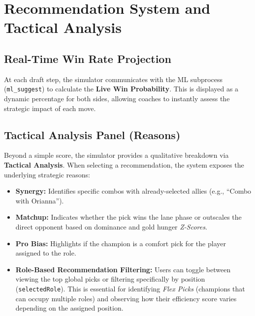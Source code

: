 \documentclass[12pt, a4paper]{article}
\begin{document}
    \section{Recommendation System and Tactical Analysis}

    \subsection{Real-Time Win Rate Projection}
    At each draft step, the simulator communicates with the ML subprocess (\texttt{ml\_suggest}) to calculate the \textbf{Live Win Probability}. This is displayed as a dynamic percentage for both sides, allowing coaches to instantly assess the strategic impact of each move.

    \subsection{Tactical Analysis Panel (Reasons)}
    Beyond a simple score, the simulator provides a qualitative breakdown via \textbf{Tactical Analysis}. When selecting a recommendation, the system exposes the underlying strategic reasons:
    \begin{itemize}
        \item \textbf{Synergy:} Identifies specific combos with already-selected allies (e.g., ``Combo with Orianna'').
        \item \textbf{Matchup:} Indicates whether the pick wins the lane phase or outscales the direct opponent based on dominance and gold hunger \textit{Z-Scores}.
        \item \textbf{Pro Bias:} Highlights if the champion is a comfort pick for the player assigned to the role.
        \item \textbf{Role-Based Recommendation Filtering:} Users can toggle between viewing the top global picks or filtering specifically by position (\texttt{selectedRole}). This is essential for identifying \textit{Flex Picks} (champions that can occupy multiple roles) and observing how their efficiency score varies depending on the assigned position.
    \end{itemize}

    \newpage
\end{document}
